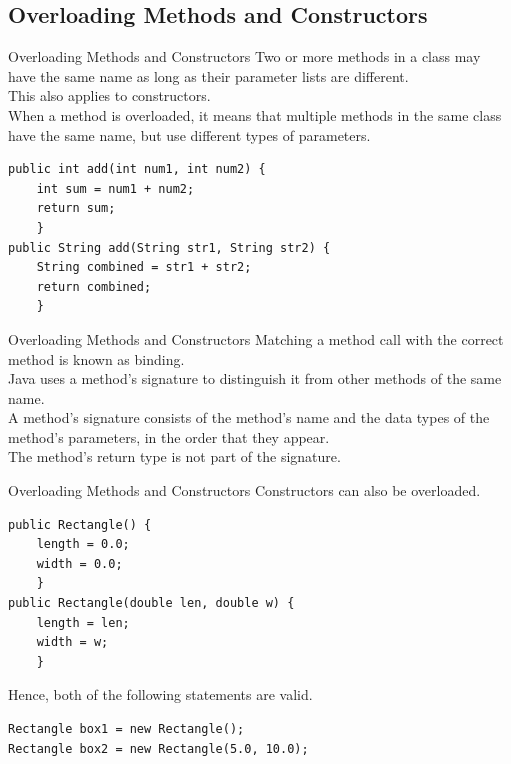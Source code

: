 \documentclass[11pt]{beamer}
\begin{document}
\subsection{Overloading Methods and Constructors}
\begin{frame}[fragile]{Overloading Methods and Constructors}
\footnotesize
Two or more methods in a class may have the same name as long as their parameter lists are different. \\ \vspace{1em} 
This also applies to constructors. \\ \vspace{1em}
When a method is overloaded, it means that multiple methods in the same class have the same name, but use different types of parameters. \\
\vspace{1em}
    \begin{lstlisting}
public int add(int num1, int num2) {
    int sum = num1 + num2;
    return sum;
    }
public String add(String str1, String str2) {
    String combined = str1 + str2;
    return combined;
    }
    \end{lstlisting}
\end{frame}

\begin{frame}[fragile]{Overloading Methods and Constructors}
    Matching a method call with the correct method is known as binding. \\ \vspace{1em}
    Java uses a method’s signature to distinguish it from other methods of the same name. \\ \vspace{1em}
    A method’s signature consists of the method’s name and the data types of the method’s parameters, in the order that they appear. \\ \vspace{1em}
    The method’s return type is not part of the signature. 
\end{frame}

\begin{frame}[fragile]{Overloading Methods and Constructors}
Constructors can also be overloaded.
    \begin{lstlisting}
public Rectangle() {
    length = 0.0;
    width = 0.0;
    }
public Rectangle(double len, double w) {
    length = len;
    width = w;
    }
    \end{lstlisting}
    Hence, both of the following statements are valid.
    \begin{lstlisting}
Rectangle box1 = new Rectangle();
Rectangle box2 = new Rectangle(5.0, 10.0);
    \end{lstlisting}
\end{frame}
\end{document}
